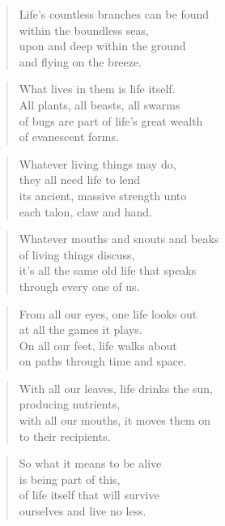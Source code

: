 \documentclass[10pt,a4paper]{article}
\begin{document}
\begin{paracol}{2}
\begin{verse}
Life’s countless branches can be found\\
within the boundless seas,\\
upon and deep within the ground\\
and flying on the breeze.
\end{verse}

\begin{verse}
What lives in them is life itself.\\
All plants, all beasts, all swarms\\
of bugs are part of life’s great wealth\\
of evanescent forms.
\end{verse}

\begin{verse}
Whatever living things may do,\\
they all need life to lend\\
its ancient, massive strength unto\\
each talon, claw and hand.
\end{verse}

\begin{verse}
Whatever mouths and snouts and beaks\\
of living things discuss,\\
it’s all the same old life that speaks\\
through every one of us.
\end{verse}

\begin{verse}
From all our eyes, one life looks out\\
at all the games it plays.\\
On all our feet, life walks about\\
on paths through time and space.
\end{verse}

\begin{verse}
With all our leaves, life drinks the sun,\\
producing nutrients,\\
with all our mouths, it moves them on\\
to their recipients.
\end{verse}

\begin{verse}
So what it means to be alive\\
is being part of this,\\
of life itself that will survive\\
ourselves and live no less.
\end{verse}


\end{paracol}
\end{document}
